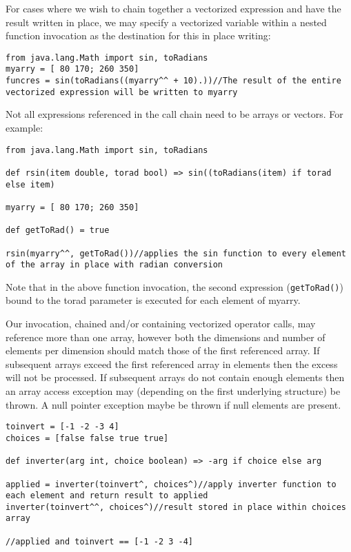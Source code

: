 \documentclass[conc-doc]{subfiles}
\begin{document}
For cases where we wish to chain together a vectorized expression and have the result written in place, we may specify a vectorized variable within a nested function invocation as the destination for this in place writing:
\begin{lstlisting}
from java.lang.Math import sin, toRadians
myarry = [ 80 170; 260 350]
funcres = sin(toRadians((myarry^^ + 10).))//The result of the entire vectorized expression will be written to myarry
\end{lstlisting}

Not all expressions referenced in the call chain need to be arrays or vectors. For example:
\begin{lstlisting}
from java.lang.Math import sin, toRadians

def rsin(item double, torad bool) => sin((toRadians(item) if torad else item)

myarry = [ 80 170; 260 350]

def getToRad() = true

rsin(myarry^^, getToRad())//applies the sin function to every element of the array in place with radian conversion
\end{lstlisting}

Note that in the above function invocation, the second expression (\lstinline{getToRad()}) bound to the torad parameter is executed for each element of myarry.

Our invocation, chained and/or containing vectorized operator calls, may reference more than one array, however both the dimensions and number of elements per dimension should match those of the first referenced array. If subsequent arrays exceed the first referenced array in elements then the excess will not be processed. If subsequent arrays do not contain enough elements then an array access exception may (depending on the first underlying structure) be thrown. A null pointer exception maybe be thrown if null elements are present.
\begin{lstlisting}
toinvert = [-1 -2 -3 4]
choices = [false false true true]

def inverter(arg int, choice boolean) => -arg if choice else arg

applied = inverter(toinvert^, choices^)//apply inverter function to each element and return result to applied
inverter(toinvert^^, choices^)//result stored in place within choices array

//applied and toinvert == [-1 -2 3 -4]
\end{lstlisting}
\end{document}
